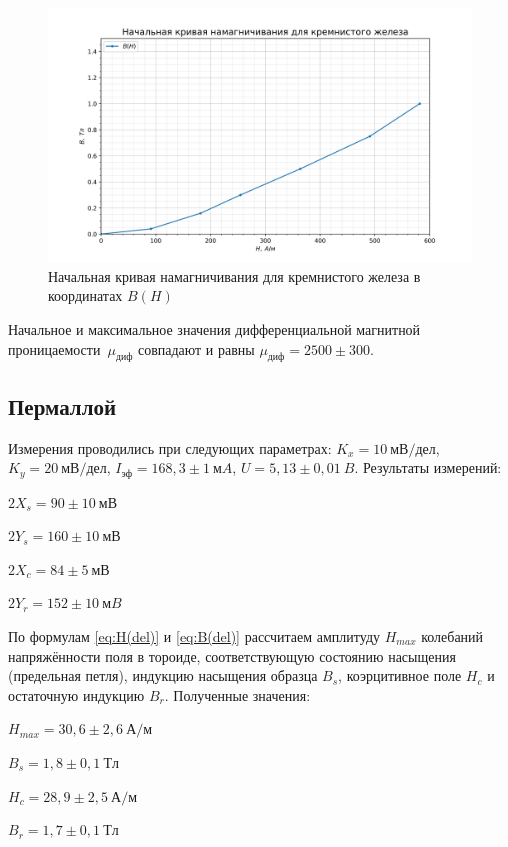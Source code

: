 \documentclass[a4paper, 12pt]{article}
\begin{document}
\begin{figure}[h!]
\begin{center}
    \includegraphics[scale=0.7]{3.4.5_1.png}
\end{center}
\caption{Начальная кривая намагничивания для кремнистого железа в координатах $B(H)$}
\label{fig:Fe-Si:nach_petlya}
\end{figure}

Начальное и максимальное значения дифференциальной магнитной проницаемости~$\mu_{диф}$ совпадают и равны $\mu_{диф} = 2500\pm300$.

\subsection{Пермаллой}

Измерения проводились при следующих параметрах: $K_x = 10~мВ/дел$, $K_y = 20~мВ/дел$, $I_{эф} = 168,3\pm1~мA$, $U = 5,13\pm0,01~B$. Результаты измерений:
\begin{description}
\item{} $2X_s = 90\pm10~мВ$
\item{} $2Y_s = 160\pm10~мВ$
\item{} $2X_c = 84\pm5~мВ$
\item{} $2Y_r = 152\pm10~мB$
\end{description}

По формулам \eqref{eq:H(del)} и \eqref{eq:B(del)} рассчитаем амплитуду $H_{max}$ колебаний напряжённости поля в тороиде, соответствующую состоянию насыщения (предельная петля), индукцию насыщения образца $B_s$, коэрцитивное поле $H_c$ и остаточную индукцию $B_r$. Полученные значения:
\begin{description}
\item{} $H_{max} = 30,6\pm2,6~А/м$
\item{} $B_s = 1,8\pm0,1~Тл$
\item{} $H_c = 28,9\pm2,5~А/м$
\item{} $B_r = 1,7\pm0,1~Тл$
\end{description}
\end{document}
